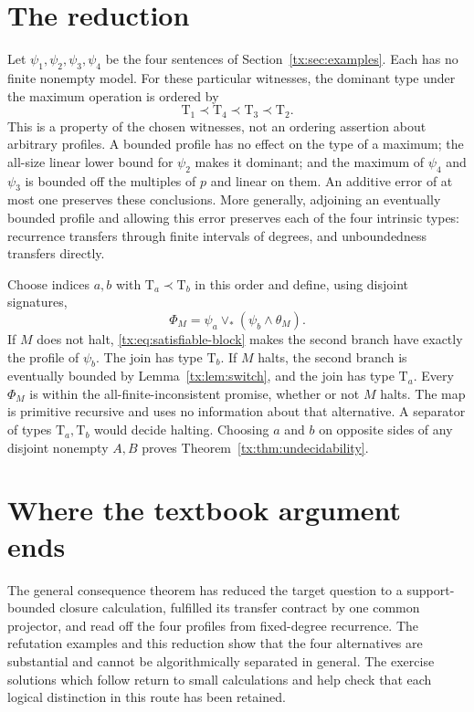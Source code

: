 \documentclass[11pt,a4paper,oneside,openany]{book}
\theoremstyle{definition}\newtheorem{definition}[theorem]{Definition}
\theoremstyle{remark}\newtheorem{remark}[theorem]{Remark}
\newcommand{\join}{\mathbin{\vee_*}}
\numberwithin{equation}{chapter}
\begin{document}
\section{The reduction}
Let $\psi_1,\psi_2,\psi_3,\psi_4$ be the four sentences of
Section~\ref{tx:sec:examples}. Each has no finite nonempty model. For these particular
witnesses, the dominant type under the maximum operation is ordered by
\[
                 \mathrm T_1\prec\mathrm T_4\prec\mathrm T_3\prec\mathrm T_2.
\]
This is a property of the chosen witnesses, not an ordering assertion about
arbitrary profiles. A bounded profile has no effect on the type of a maximum;
the all-size linear lower bound for $\psi_2$ makes it dominant; and the
maximum of $\psi_4$ and $\psi_3$ is bounded off the multiples of $p$ and
linear on them. An additive error of at most one preserves these conclusions.
More generally, adjoining an eventually bounded profile and allowing this
error preserves each of the four intrinsic types: recurrence transfers
through finite intervals of degrees, and unboundedness transfers directly.

Choose indices $a,b$ with $\mathrm T_a\prec\mathrm T_b$ in this order
and define, using disjoint signatures,
\[
             \Phi_M=\psi_a\join(\psi_b\wedge\theta_M).
\]
If $M$ does not halt, \eqref{tx:eq:satisfiable-block} makes the second branch
have exactly the profile of $\psi_b$. The join has type $\mathrm T_b$. If $M$ halts,
the second branch is eventually bounded by Lemma~\ref{tx:lem:switch}, and the
join has type $\mathrm T_a$. Every $\Phi_M$ is within the all-finite-inconsistent
promise, whether or not $M$ halts. The map is primitive recursive and
uses no information about that alternative. A separator of types $\mathrm T_a,\mathrm T_b$
would decide halting. Choosing $a$ and $b$ on opposite sides of any
disjoint nonempty $A,B$ proves Theorem~\ref{tx:thm:undecidability}.

\section{Where the textbook argument ends}
The general consequence theorem has reduced the target question to a
support-bounded closure calculation, fulfilled its transfer contract by
one common projector, and read off the four profiles from fixed-degree
recurrence. The refutation examples and this reduction show that the
four alternatives are substantial and cannot be algorithmically
separated in general. The exercise solutions which follow return to
small calculations and help check that each logical distinction in this
route has been retained.
\end{document}
